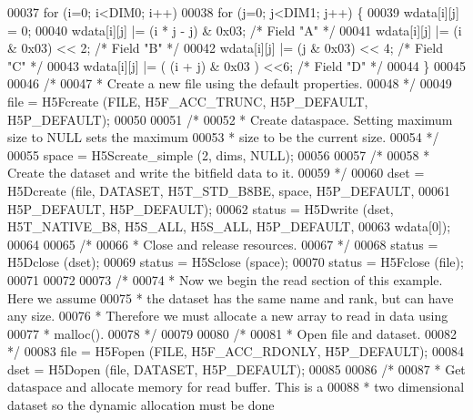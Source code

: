 \begin{DoxyCode}
00037     \textcolor{keywordflow}{for} (i=0; i<DIM0; i++)
00038         \textcolor{keywordflow}{for} (j=0; j<DIM1; j++) \{
00039             wdata[i][j] = 0;
00040             wdata[i][j] |= (i * j - j) & 0x03;          \textcolor{comment}{/* Field "A" */}
00041             wdata[i][j] |= (i & 0x03) << 2;             \textcolor{comment}{/* Field "B" */}
00042             wdata[i][j] |= (j & 0x03) << 4;             \textcolor{comment}{/* Field "C" */}
00043             wdata[i][j] |= ( (i + j) & 0x03 ) <<6;      \textcolor{comment}{/* Field "D" */}
00044         \}
00045 
00046     \textcolor{comment}{/*}
00047 \textcolor{comment}{     * Create a new file using the default properties.}
00048 \textcolor{comment}{     */}
00049     file = H5Fcreate (FILE, H5F\_ACC\_TRUNC, H5P\_DEFAULT, H5P\_DEFAULT);
00050 
00051     \textcolor{comment}{/*}
00052 \textcolor{comment}{     * Create dataspace.  Setting maximum size to NULL sets the maximum}
00053 \textcolor{comment}{     * size to be the current size.}
00054 \textcolor{comment}{     */}
00055     space = H5Screate\_simple (2, dims, NULL);
00056 
00057     \textcolor{comment}{/*}
00058 \textcolor{comment}{     * Create the dataset and write the bitfield data to it.}
00059 \textcolor{comment}{     */}
00060     dset = H5Dcreate (file, DATASET, H5T\_STD\_B8BE, space, H5P\_DEFAULT,
00061                 H5P\_DEFAULT, H5P\_DEFAULT);
00062     status = H5Dwrite (dset, H5T\_NATIVE\_B8, H5S\_ALL, H5S\_ALL, H5P\_DEFAULT,
00063                 wdata[0]);
00064 
00065     \textcolor{comment}{/*}
00066 \textcolor{comment}{     * Close and release resources.}
00067 \textcolor{comment}{     */}
00068     status = H5Dclose (dset);
00069     status = H5Sclose (space);
00070     status = H5Fclose (file);
00071 
00072 
00073     \textcolor{comment}{/*}
00074 \textcolor{comment}{     * Now we begin the read section of this example.  Here we assume}
00075 \textcolor{comment}{     * the dataset has the same name and rank, but can have any size.}
00076 \textcolor{comment}{     * Therefore we must allocate a new array to read in data using}
00077 \textcolor{comment}{     * malloc().}
00078 \textcolor{comment}{     */}
00079 
00080     \textcolor{comment}{/*}
00081 \textcolor{comment}{     * Open file and dataset.}
00082 \textcolor{comment}{     */}
00083     file = H5Fopen (FILE, H5F\_ACC\_RDONLY, H5P\_DEFAULT);
00084     dset = H5Dopen (file, DATASET, H5P\_DEFAULT);
00085 
00086     \textcolor{comment}{/*}
00087 \textcolor{comment}{     * Get dataspace and allocate memory for read buffer.  This is a}
00088 \textcolor{comment}{     * two dimensional dataset so the dynamic allocation must be done}

\end{DoxyCode}
